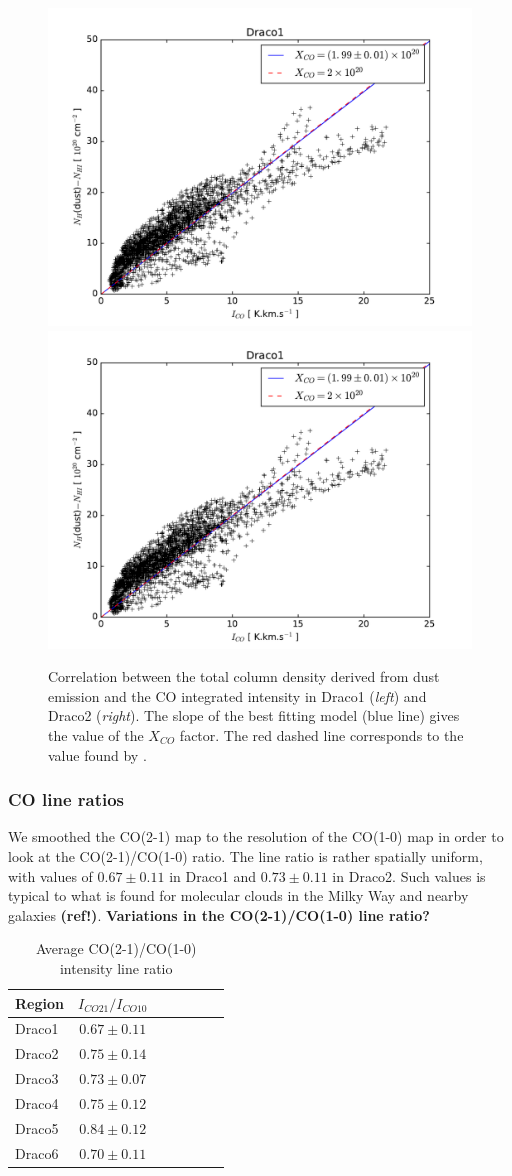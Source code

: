 \documentclass[traditabstract]{aa}
\begin{document}
\begin{figure}[h!]
  \centering
  \includegraphics[page=1,width=0.48\linewidth,trim=30 10 50 30,clip=true]{Figures/dust-CO_comparison.pdf}
  \hspace{3mm}
  \includegraphics[page=2,width=0.48\linewidth,trim=30 10 50 30,clip=true]{Figures/dust-CO_comparison.pdf}
  \caption{\label{Xco} Correlation between the total column density derived from dust emission and the CO integrated intensity in Draco1 (\emph{left}) and Draco2 (\emph{right}). The slope of the best fitting model (blue line) gives the value of the $X_{CO}$ factor. The red dashed line corresponds to the value found by \cite{Moritz_1998}.}
\end{figure}


      \subsubsection{CO line ratios}

   We smoothed the CO(2-1) map to the resolution of the CO(1-0) map in order to look at the CO(2-1)/CO(1-0) ratio. The line ratio is rather spatially uniform, with values of $0.67\pm 0.11$ in Draco1 and $0.73\pm 0.11$ in Draco2. Such values is typical to what is found for molecular clouds in the Milky Way and nearby galaxies \textbf{(ref!)}. \textbf{Variations in the CO(2-1)/CO(1-0) line ratio?}

\begin{table}[h]
  \centering
  \footnotesize
  \caption{Average CO(2-1)/CO(1-0) intensity line ratio}
  \begin{tabular}{lcccccc}
    \hline \hline
    Region & $I_{CO21}/I_{CO10}$ \\ \hline
    Draco1 &   $0.67\pm 0.11$    \\
    Draco2 &   $0.75\pm 0.14$    \\
    Draco3 &   $0.73\pm 0.07$    \\
    Draco4 &   $0.75\pm 0.12$    \\
    Draco5 &   $0.84\pm 0.12$    \\
    Draco6 &   $0.70\pm 0.11$    \\ \hline
  \end{tabular}
\end{table}
\end{document}
